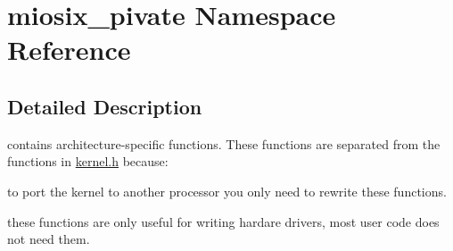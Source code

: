 \hypertarget{namespacemiosix__pivate}{\section{miosix\-\_\-pivate Namespace Reference}
\label{namespacemiosix__pivate}
}


\subsection{Detailed Description}
contains architecture-\/specific functions. These functions are separated from the functions in \hyperlink{kernel_8h_source}{kernel.\-h} because\-:\par

\begin{DoxyItemize}
\item to port the kernel to another processor you only need to rewrite these functions.
\item these functions are only useful for writing hardare drivers, most user code does not need them. 
\end{DoxyItemize}